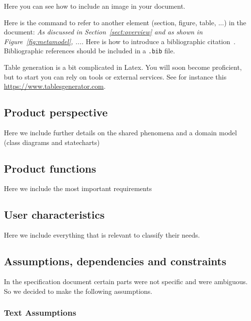 Here you can see how to include an image in your document.



Here is the command to refer to another element (section, figure, table, ...) in the document: \emph{As discussed in Section~\ref{sect:overview} and as shown in Figure~\ref{fig:metamodel}, ...}. Here is how to introduce a bibliographic citation~\cite{DAM}. Bibliographic references should be included in a \texttt{.bib} file. 

Table generation is a bit complicated in Latex. You will soon become proficient, but to start you can rely on tools or external services. See for instance this \href{https://www.tablesgenerator.com}{https://www.tablesgenerator.com}. 
\subsection{Product perspective}
Here we include further details on the shared phenomena and a domain model (class diagrams and statecharts)
\subsection{Product functions}
Here we include the most important requirements
\subsection{User characteristics}
Here we include everything that is relevant to classify their needs.
\subsection{Assumptions, dependencies and constraints}
In the specification document certain parts were not specific and were ambiguous. So we decided to make the following assumptions.
\subsubsection{Text Assumptions}


